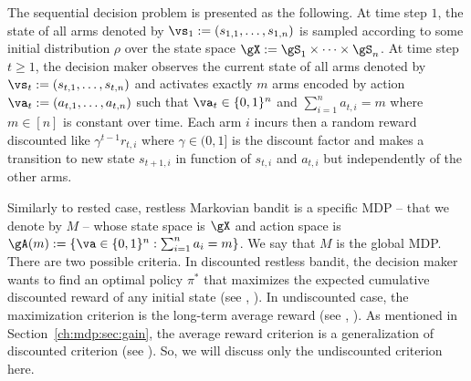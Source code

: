 The sequential decision problem is presented as the following.
At time step $1$, the state of all arms denoted by $\vs_1:=(s_{1,1},\dots,s_{1,n})$ is sampled according to some initial distribution $\rho$ over the state space $\gX:=\gS_1\times\dots\times\gS_n$.
At time step $t\ge1$, the decision maker observes the current state of all arms denoted by $\vs_t:=(s_{t,1},\dots,s_{t,n})$ and activates exactly $m$ arms encoded by action $\va_t:=(a_{t,1},\dots,a_{t,n})$ such that $\va_t\in\{0,1\}^n$ and $\sum_{i=1}^{n} a_{t,i}=m$ where $m\in[n]$ is constant over time.
Each arm $i$ incurs then a random reward discounted like $\gamma^{t-1}r_{t,i}$ where $\gamma\in(0,1]$ is the discount factor and makes
a transition to new state $s_{t+1,i}$ in function of $s_{t,i}$ and $a_{t,i}$ but independently of the other arms.

Similarly to rested case, restless Markovian bandit is a specific MDP -- that we denote by $M$ -- whose state space is $\gX$ and action space is $\gA(m):=\{\va\in\{0,1\}^n : \sum_{i=1}^{n}a_i =m\}$.
We say that $M$ is the global MDP.
There are two possible criteria.
In discounted restless bandit, the decision maker wants to find an optimal policy $\pi^*$ that maximizes the expected cumulative discounted reward of any initial state (see \eg, \cite{nino2007dynamic, fu2019towards, akbarzadeh2020conditions, nino2020fast}). 
In undiscounted case, the maximization criterion is the long-term average reward (see \eg, \cite{whittle1988restless, whittle1996optimal, papadimitriou1994complexity, gibson2021novel, avrachenkov2022whittle}).
As mentioned in Section~\ref{ch:mdp:sec:gain}, the average reward criterion is a generalization of discounted criterion (see ).
So, we will discuss only the undiscounted criterion here.

